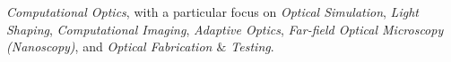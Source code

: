 \textit{Computational Optics}, with a particular focus on \textit{Optical Simulation}, \textit{Light Shaping}, \textit{Computational Imaging}, \textit{Adaptive Optics}, \textit{Far-field Optical Microscopy (Nanoscopy)}, and \textit{Optical Fabrication \(\&\) Testing}.